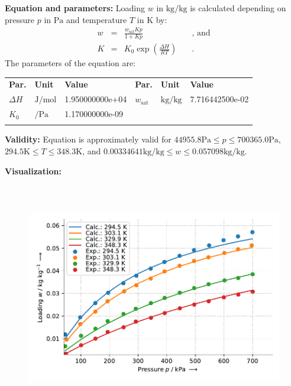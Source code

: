 \textbf{Equation and parameters:}
\newline
%
Loading $w$ in $\si{\kilogram\per\kilogram}$ is calculated depending on pressure $p$ in $\si{\pascal}$ and temperature $T$ in $\si{\kelvin}$ by:
%
\begin{equation*}
\begin{split}
w &=& \frac{w_\mathrm{sat} K p}{1 + K p} & \quad\text{, and} \\
K &=& K_0 \exp \left( \frac{\Delta H}{R T} \right) & \quad\text{.}
\end{split}
\end{equation*}
%
The parameters of the equation are:
%
\begin{longtable}[l]{lll|lll}
\toprule
\addlinespace
\textbf{Par.} & \textbf{Unit} & \textbf{Value} &	\textbf{Par.} & \textbf{Unit} & \textbf{Value} \\
\addlinespace
\midrule
\endhead

\bottomrule
\endfoot
\bottomrule
\endlastfoot
\addlinespace

$\Delta H$ & $\si{\joule\per\mole}$ & 1.950000000e+04 & $w_\mathrm{sat}$ & $\si{\kilogram\per\kilogram}$ & 7.716442500e-02 \\
$K_0$ & $\si{\per\pascal}$ & 1.170000000e-09 & & & \\

\addlinespace\end{longtable}

\textbf{Validity:}
\newline
Equation is approximately valid for $44955.8 \si{\pascal} \leq p \leq 700365.0 \si{\pascal}$,  $294.5 \si{\kelvin} \leq T \leq 348.3 \si{\kelvin}$, and $0.00334641 \si{\kilogram\per\kilogram} \leq w \leq 0.057098 \si{\kilogram\per\kilogram}$.
\newline

\textbf{Visualization:}
%
\begin{figure}[!htp]
{\noindent\includegraphics[height=10cm, keepaspectratio]{figs/ads/ads_Methane_activated_carbon_Norit_RB_1_Langmuir_1.pdf}}
\end{figure}
%

